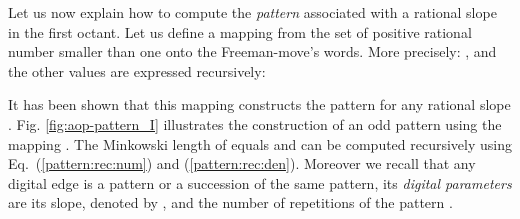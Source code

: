 \documentclass{llncs}
\newcommand{\Equ}[1]{Eq.~(\ref{#1})}
\begin{document}
Let us now explain how to compute the \emph{pattern} associated with a
rational slope  in the first octant. Let us define  a mapping
from the set of positive rational number smaller than one onto the
Freeman-move's words. More precisely: ,  and the other values are expressed recursively:


It has been shown that this mapping constructs the pattern  for
any rational slope . Fig. \ref{fig:aop-pattern_I}
illustrates the construction of an odd pattern using the mapping .
The Minkowski  length of  equals  and can be computed recursively using \Equ{pattern:rec:num} and
(\ref{pattern:rec:den}). Moreover we recall that any digital edge is a
pattern or a succession of the same pattern, its {\em digital
parameters} are its slope, denoted by , and the number
 of repetitions of the pattern .
\end{document}
